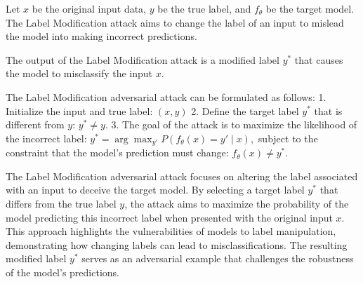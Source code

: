 
Let \( x \) be the original input data, \( y \) be the true label, and \( f_{\theta} \) be the target model. The Label Modification attack aims to change the label of an input to mislead the model into making incorrect predictions.

The output of the Label Modification attack is a modified label \( y^* \) that causes the model to misclassify the input \( x \).

The Label Modification adversarial attack can be formulated as follows:
1. Initialize the input and true label:
   $
   (x, y)
   $
2. Define the target label \( y^* \) that is different from \( y \):
   $
   y^* \neq y.
   $
3. The goal of the attack is to maximize the likelihood of the incorrect label:
   $
   y^* = \arg\max_{y'} P(f_{\theta}(x) = y' \mid x),
   $
   subject to the constraint that the model's prediction must change:
   $
   f_{\theta}(x) \neq y^*.
   $

The Label Modification adversarial attack focuses on altering the label associated with an input to deceive the target model. By selecting a target label \( y^* \) that differs from the true label \( y \), the attack aims to maximize the probability of the model predicting this incorrect label when presented with the original input \( x \). This approach highlights the vulnerabilities of models to label manipulation, demonstrating how changing labels can lead to misclassifications. The resulting modified label \( y^* \) serves as an adversarial example that challenges the robustness of the model's predictions.